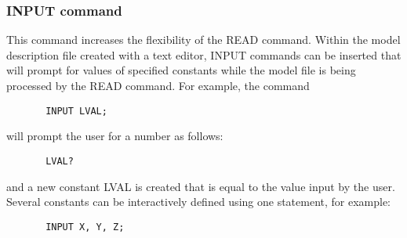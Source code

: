 \subsubsection{INPUT command} This command
increases the flexibility of the {\isf READ} command.  Within the model
description file created with a text editor, {\isf INPUT} commands can be
inserted that will prompt for values of specified constants while the model
file is being processed by the {\isf READ} command.  For example, the command
\begin{verbatim}
       INPUT LVAL;
\end{verbatim}
will prompt the user for a number as follows:
\begin{verbatim}
       LVAL? 
\end{verbatim}
and a new constant {\isf LVAL} is created that is equal to the value input by
the user.  Several constants can be interactively defined using one statement,
for example:
\begin{verbatim}
       INPUT X, Y, Z;
\end{verbatim}

